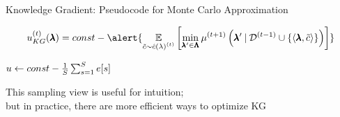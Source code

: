 \begin{frame}[c]{Knowledge Gradient: Pseudocode for Monte Carlo Approximation}

\[\iter{\acq}_{KG}(\conf) = const - \alert{
\E_{\tilde{\cost} \sim \iter[\bocount]{\surro(\lambda)}}
        \left[\min_{\conf'\in\pcs}\iter[\bocount+1]{\mean}\left(\conf'\given{\iter[\bocount-1]{\dataset} \cup \left\{\left\langle\conf, \tilde{\cost} \right\rangle \right\}}\right)\right]
}\]

\begin{center}
\begin{minipage}{0.75\textwidth}
\begin{algorithm}[H]
    \LinesNumbered
    \setcounter{AlgoLine}{0}
    
    

    $u\leftarrow const - \frac{1}{S} \sum_{s=1}^S e[s]$\;

    \caption*{Sampling Based Knowledge Gradient Acquisition Function}
\end{algorithm}
\end{minipage}

\pause
\bigskip
This sampling view is useful for intuition;\\ but in practice, there are more efficient ways to optimize KG 

\end{center}

\end{frame}

